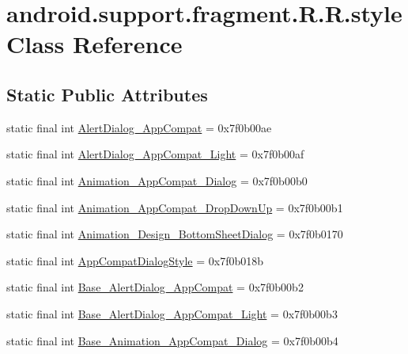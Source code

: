 \hypertarget{classandroid_1_1support_1_1fragment_1_1_r_1_1style}{
\section{android.support.fragment.R.R.style Class Reference}
\label{classandroid_1_1support_1_1fragment_1_1_r_1_1style}
}
\subsection*{Static Public Attributes}
\begin{CompactItemize}
\item 
static final int \hyperlink{classandroid_1_1support_1_1fragment_1_1_r_1_1style_e5894001a41fa29157228a826dd6cc40}{AlertDialog\_\-AppCompat} = 0x7f0b00ae
\item 
static final int \hyperlink{classandroid_1_1support_1_1fragment_1_1_r_1_1style_b3f4e25a39d671780994ed6ce04799ab}{AlertDialog\_\-AppCompat\_\-Light} = 0x7f0b00af
\item 
static final int \hyperlink{classandroid_1_1support_1_1fragment_1_1_r_1_1style_6a9f87c35d6d74c3e210e969ba546f30}{Animation\_\-AppCompat\_\-Dialog} = 0x7f0b00b0
\item 
static final int \hyperlink{classandroid_1_1support_1_1fragment_1_1_r_1_1style_b47bf58ddb17b7de7c1ff928dcbf0e48}{Animation\_\-AppCompat\_\-DropDownUp} = 0x7f0b00b1
\item 
static final int \hyperlink{classandroid_1_1support_1_1fragment_1_1_r_1_1style_f5891dcbcee283ca6ac9b3484c845367}{Animation\_\-Design\_\-BottomSheetDialog} = 0x7f0b0170
\item 
static final int \hyperlink{classandroid_1_1support_1_1fragment_1_1_r_1_1style_0f40a613f24baf23150c4ecae24dc0bf}{AppCompatDialogStyle} = 0x7f0b018b
\item 
static final int \hyperlink{classandroid_1_1support_1_1fragment_1_1_r_1_1style_f1989f6723f19a14ce6496de7fa48a00}{Base\_\-AlertDialog\_\-AppCompat} = 0x7f0b00b2
\item 
static final int \hyperlink{classandroid_1_1support_1_1fragment_1_1_r_1_1style_88188d4aa237ef0f61b3b5e689cda75c}{Base\_\-AlertDialog\_\-AppCompat\_\-Light} = 0x7f0b00b3
\item 
static final int \hyperlink{classandroid_1_1support_1_1fragment_1_1_r_1_1style_b10736786d143c547e011e3f3203e835}{Base\_\-Animation\_\-AppCompat\_\-Dialog} = 0x7f0b00b4
\item 

\end{CompactItemize}
